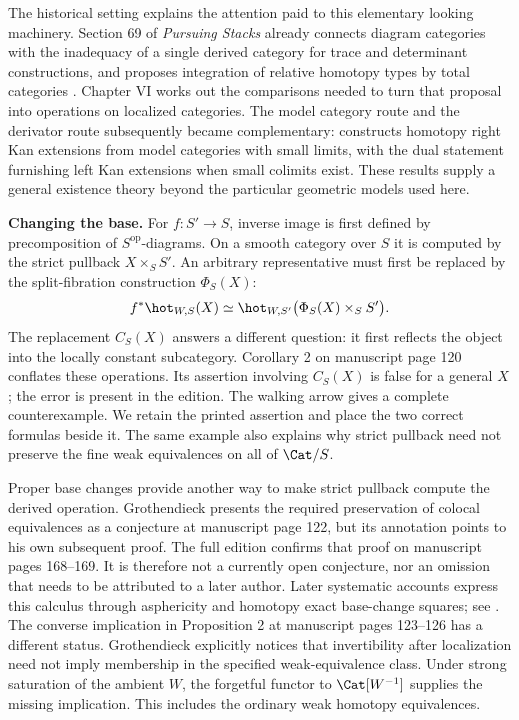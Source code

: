 The historical setting explains the attention paid to this elementary
looking machinery. Section 69 of \emph{Pursuing Stacks} already connects
diagram categories with the inadequacy of a single derived category for
trace and determinant constructions, and proposes integration of relative
homotopy types by total categories
\citep[\S69]{Grothendieck1983}. Chapter VI works out the comparisons needed
to turn that proposal into operations on localized categories. The model
category route and the derivator route subsequently became complementary:
\citet[Theorem 6.11]{Cisinski2003} constructs homotopy right Kan extensions
from model categories with small limits, with the dual statement furnishing
left Kan extensions when small colimits exist. These results supply a
general existence theory beyond the particular geometric models used here.

\medskip
\noindent\textbf{Changing the base.}
For $f:S'\to S$, inverse image is first defined by precomposition of
$S^{\mathrm{op}}$-diagrams. On a smooth category over $S$ it is computed by
the strict pullback $X\times_S S'$. An arbitrary representative must first
be replaced by the split-fibration construction $\Phi_S(X)$:
\[
 f^*\hot_{W,S}(X)\simeq
 \hot_{W,S'}\bigl(\Phi_S(X)\times_S S'\bigr).
\]
The replacement $C_S(X)$ answers a different question: it first reflects
the object into the locally constant subcategory. Corollary 2 on manuscript
page 120 conflates these operations. Its assertion involving $C_S(X)$ is
false for a general $X$; the error is present in the edition. The walking
arrow gives a complete counterexample. We retain the printed assertion and
place the two correct formulas beside it. The same example also explains
why strict pullback need not preserve the fine weak equivalences on all of
$\Cat/S$.

Proper base changes provide another way to make strict pullback compute
the derived operation. Grothendieck presents the required preservation of
colocal equivalences as a conjecture at manuscript page 122, but its
annotation points to his own subsequent proof. The full edition confirms
that proof on manuscript pages 168--169. It is therefore not a currently
open conjecture, nor an omission that needs to be attributed to a later
author. Later systematic accounts express this calculus through asphericity
and homotopy exact base-change squares; see
\citet[Theorems 4.13 and 5.4]{Maltsiniotis2005Asphericite}. The converse
implication in Proposition 2 at manuscript pages 123--126 has a different
status. Grothendieck explicitly notices that invertibility after
localization need not imply membership in the specified weak-equivalence
class. Under strong saturation of the ambient $W$, the forgetful functor to
$\Cat[W^{-1}]$ supplies the missing implication. This includes the ordinary
weak homotopy equivalences.

